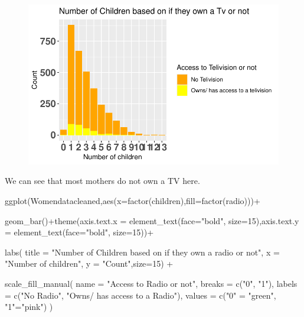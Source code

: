 \documentclass[
  letterpaper,
  DIV=11,
  numbers=noendperiod]{scrartcl}
\newenvironment{Shaded}{\begin{snugshade}}{\end{snugshade}}
\newcommand{\AttributeTok}[1]{\textcolor[rgb]{0.40,0.45,0.13}{#1}}
\newcommand{\DecValTok}[1]{\textcolor[rgb]{0.68,0.00,0.00}{#1}}
\newcommand{\FunctionTok}[1]{\textcolor[rgb]{0.28,0.35,0.67}{#1}}
\newcommand{\NormalTok}[1]{\textcolor[rgb]{0.00,0.23,0.31}{#1}}
\newcommand{\OtherTok}[1]{\textcolor[rgb]{0.00,0.23,0.31}{#1}}
\newcommand{\SpecialCharTok}[1]{\textcolor[rgb]{0.37,0.37,0.37}{#1}}
\newcommand{\StringTok}[1]{\textcolor[rgb]{0.13,0.47,0.30}{#1}}
\begin{document}
\begin{figure}[H]

{\centering \includegraphics{Fertility_Rates_Education_Impact_Botswana_files/figure-pdf/unnamed-chunk-19-1.pdf}

}

\end{figure}

We can see that most mothers do not own a TV here.

\begin{Shaded}
\begin{Highlighting}[]
\FunctionTok{ggplot}\NormalTok{(Womendatacleaned,}\FunctionTok{aes}\NormalTok{(}\AttributeTok{x=}\FunctionTok{factor}\NormalTok{(children),}\AttributeTok{fill=}\FunctionTok{factor}\NormalTok{(radio)))}\SpecialCharTok{+}
  
\FunctionTok{geom\_bar}\NormalTok{()}\SpecialCharTok{+}\FunctionTok{theme}\NormalTok{(}\AttributeTok{axis.text.x =} \FunctionTok{element\_text}\NormalTok{(}\AttributeTok{face=}\StringTok{"bold"}\NormalTok{, }\AttributeTok{size=}\DecValTok{15}\NormalTok{),}\AttributeTok{axis.text.y =} \FunctionTok{element\_text}\NormalTok{(}\AttributeTok{face=}\StringTok{"bold"}\NormalTok{, }\AttributeTok{size=}\DecValTok{15}\NormalTok{))}\SpecialCharTok{+}
  
\FunctionTok{labs}\NormalTok{(}
    \AttributeTok{title =} \StringTok{"Number of Children based on if they own a radio or not"}\NormalTok{,}
    \AttributeTok{x =} \StringTok{"Number of children"}\NormalTok{,}
    \AttributeTok{y =} \StringTok{"Count"}\NormalTok{,}\AttributeTok{size=}\DecValTok{15}\NormalTok{) }\SpecialCharTok{+}
   
\FunctionTok{scale\_fill\_manual}\NormalTok{(}
    \AttributeTok{name =} \StringTok{"Access to Radio or not"}\NormalTok{,}
    \AttributeTok{breaks =} \FunctionTok{c}\NormalTok{(}\StringTok{"0"}\NormalTok{, }\StringTok{"1"}\NormalTok{),}
    \AttributeTok{labels =} \FunctionTok{c}\NormalTok{(}\StringTok{"No Radio"}\NormalTok{, }\StringTok{"Owns/ has access to a Radio"}\NormalTok{),}
    \AttributeTok{values =} \FunctionTok{c}\NormalTok{(}\StringTok{"0"} \OtherTok{=} \StringTok{"green"}\NormalTok{, }\StringTok{"1"}\OtherTok{=}\StringTok{"pink"}\NormalTok{)}
\NormalTok{  )}
\end{Highlighting}
\end{Shaded}
\end{document}
